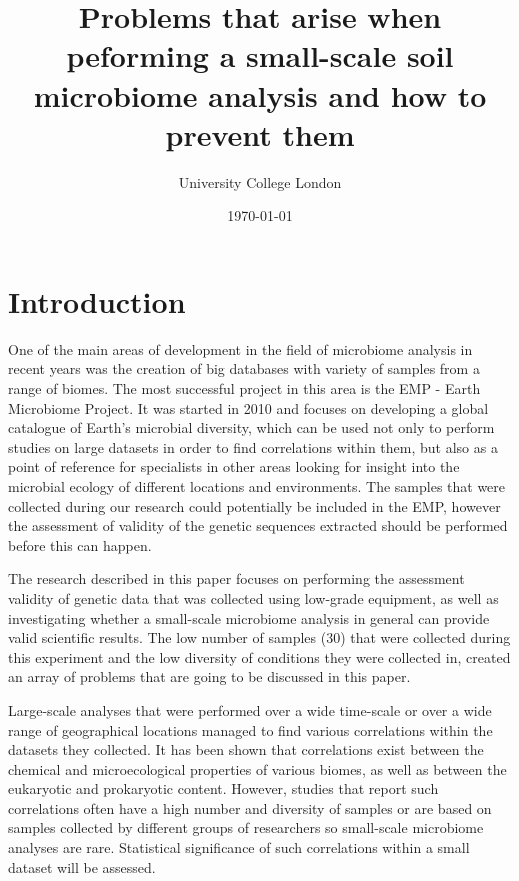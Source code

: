 \documentclass[12pt,twocolumn]{article} %
\title{Problems that arise when peforming a small-scale soil microbiome analysis and how to prevent them}
\author{\normalsize University College London \\}
\date{\today}
\begin{document}
	
\maketitle
%
%
\section{Introduction}
One of the main areas of development in the field of microbiome analysis in recent years was the creation of big databases with variety of samples from a range of biomes. The most successful project in this area is the EMP - Earth Microbiome Project\cite{Gilbert2014}. It was started in 2010 and focuses on developing a global catalogue of Earth's microbial diversity, which can be used not only to perform studies on large datasets in order to find correlations within them, but also as a point of reference for specialists in other areas looking for insight into the microbial ecology of different locations and environments. The samples that were collected during our research could potentially be included in the EMP, however the assessment of validity of the genetic sequences extracted should be performed before this can happen.
\par
The research described in this paper focuses on performing the assessment validity of genetic data that was collected using low-grade equipment, as well as investigating whether a small-scale microbiome analysis in general can provide valid scientific results. The low number of samples (30) that were collected during this experiment and the low diversity of conditions they were collected in, created an array of problems that are going to be discussed in this paper.
\par
Large-scale analyses that were performed over a wide time-scale or over a wide range of geographical locations managed to find various correlations within the datasets they collected. It has been shown that correlations exist between the chemical and microecological properties of various biomes\cite{Thompson2017,Zhalnina2014,Martins2013}, as well as between the eukaryotic and prokaryotic content. However, studies that report such correlations often have a high number and diversity of samples or are based on samples collected by different groups of researchers so small-scale microbiome analyses are rare. Statistical significance of such correlations within a small dataset will be assessed.
\par
%
%
\end{document}
